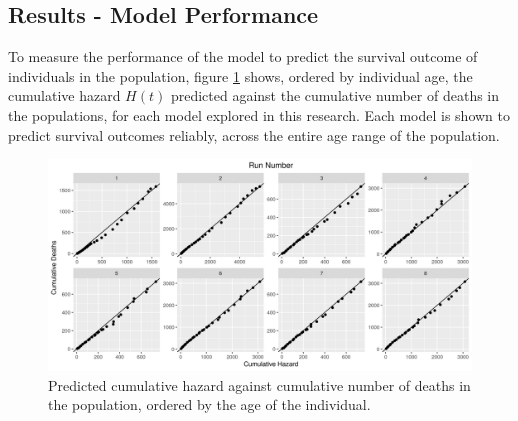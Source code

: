 \documentclass[
]{article}
\begin{document}
\subsection{Results - Model Performance}\label{results---model-performance}

To measure the performance of the model to predict the survival outcome of individuals in the population, figure \ref{fig:cumpred} shows, ordered by individual age, the cumulative hazard \(H(t)\) predicted against the cumulative number of deaths in the populations, for each model explored in this research. Each model is shown to predict survival outcomes reliably, across the entire age range of the population.

\begin{figure}
\centering
\includegraphics{./Plots/Survival/redlinpred_Cumulative_haz-death_age.png}
\caption{Predicted cumulative hazard against cumulative number of deaths in the population, ordered by the age of the individual.}\label{fig:cumpred}
\end{figure}
\end{document}
